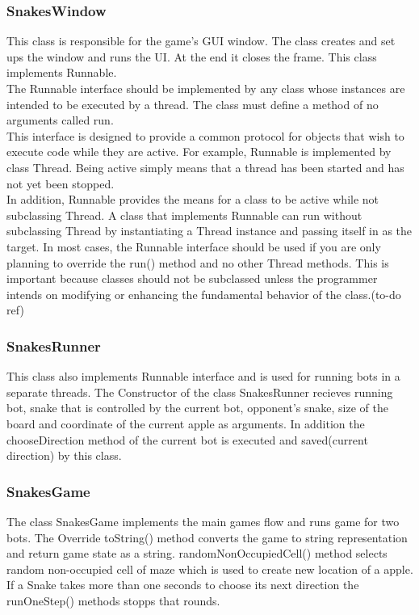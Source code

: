 \documentclass[a4paper,12pt]{article}
\begin{document}
\subsubsection{SnakesWindow}
This class is responsible for the game's GUI window. The class creates and set ups the window and runs the UI. At the end it closes the frame. This class implements Runnable.\\
The Runnable interface should be implemented by any class whose instances are intended to be executed by a thread. The class must define a method of no arguments called run.\\
This interface is designed to provide a common protocol for objects that wish to execute code while they are active. For example, Runnable is implemented by class Thread.
 Being active simply means that a thread has been started and has not yet been stopped.\\
In addition, Runnable provides the means for a class to be active while not subclassing Thread. A class that implements Runnable can run without subclassing Thread by instantiating a 
Thread instance and passing itself in as the target. In most cases, the Runnable interface should be used if you are only planning to override the run() method and no other Thread methods. This is important because classes should not be subclassed unless the programmer intends on modifying or enhancing the fundamental behavior of the class.(to-do ref)
\subsubsection{SnakesRunner}
This class also implements Runnable interface and is used for running bots in a separate threads. The Constructor of the class SnakesRunner recieves running bot, snake that is controlled by the current bot, opponent's snake, size of the board and coordinate of the current apple as arguments. In addition the chooseDirection method of the current bot is executed and saved(current direction) by this class. 
\subsubsection{SnakesGame}
The class SnakesGame implements the main games flow and runs game for two bots. The Override toString() method converts the game to string representation and return game state as a string. randomNonOccupiedCell() method selects random non-occupied cell of maze which is used to create new location of a apple. If a Snake takes more than one seconds to choose its  next direction the runOneStep() methods stopps that rounds.
\end{document}
